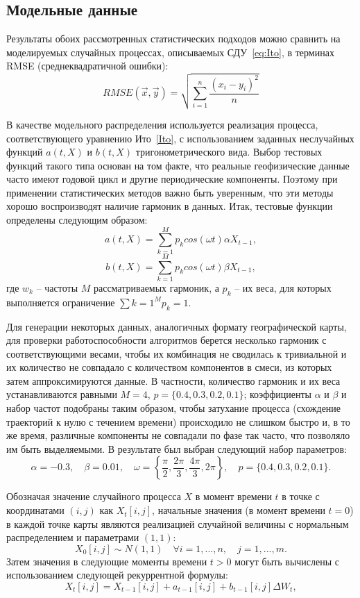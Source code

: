 \subsection{Модельные данные}
\label{sec:ModelData}
Результаты обоих рассмотренных статистических подходов можно сравнить на моделируемых случайных процессах, описываемых СДУ~\eqref{eq:Ito}, в терминах RMSE (среднеквадратичной ошибки):
$$
RMSE(\vec{x}, \vec{y}) = \sqrt{\sum\limits_{i=1}^n \frac{(x_i - y_i)^2}{n}}
$$

В качестве модельного распределения используется реализация процесса, соответствующего уравнению Ито~\eqref{Ito}, с использованием заданных неслучайных функций $a(t,X)$ и $b(t,X)$ тригонометрического вида. Выбор тестовых функций такого типа основан на том факте, что реальные геофизические данные часто имеют годовой цикл и другие периодические компоненты. Поэтому при применении статистических методов важно быть уверенным, что эти методы хорошо воспроизводят наличие гармоник в данных. Итак, тестовые функции определены следующим образом:
$$
a(t, X) = \sum\limits_{k=1}^M p_k cos(\omega t) \alpha X_{t-1},
$$
$$
b(t, X) = \sum\limits_{k=1}^M p_k cos(\omega t) \beta X_{t-1},
$$
где $w_k$ -- частоты $M$ рассматриваемых гармоник, а $p_k$ -- их веса, для которых выполняется ограничение $\sum\limits{k=1}^M p_k = 1$.

Для генерации некоторых данных, аналогичных формату географической карты, для проверки работоспособности алгоритмов берется несколько гармоник с соответствующими весами, чтобы их комбинация не сводилась к тривиальной и их количество не совпадало с количеством компонентов в смеси, из которых затем аппроксимируются данные. В частности, количество гармоник и их веса устанавливаются равными $M=4$, $p=\{0.4,0.3,0.2,0.1\}$; коэффициенты $\alpha$ и $\beta$ и набор частот подобраны таким образом, чтобы затухание процесса (схождение траекторий к нулю с течением времени) происходило не слишком быстро и, в то же время, различные компоненты не совпадали по фазе так часто, что позволяло им быть выделяемыми. В результате был выбран следующий набор параметров:
$$
\alpha = -0.3, \quad \beta = 0.01, \quad \omega = \left\{ \frac{\pi}{2}, \frac{2\pi}{3}, \frac{4\pi}{3}, 2\pi \right\}, \quad p=\{0.4, 0.3, 0.2, 0.1\}.
$$

Обозначая значение случайного процесса $X$ в момент времени $t$ в точке с координатами $(i,j)$ как $X_t[i,j]$, начальные значения (в момент времени $t=0$) в каждой точке карты являются реализацией случайной величины с нормальным распределением и параметрами $(1, 1)$:
$$
X_0[i,j] \sim N(1,1) \quad \forall i=1,...,n, \quad j=1,...,m.
$$
Затем значения в следующие моменты времени $t>0$ могут быть вычислены с использованием следующей рекуррентной формулы:
$$
X_t [i,j]= X_{t-1}[i,j] + a_{t-1} [i,j] + b_{t-1}[i,j]\Delta W_t,
$$

